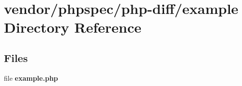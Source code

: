\section{vendor/phpspec/php-\/diff/example Directory Reference}
\label{dir_15c8aef8364336e0f742a9eada014f61}
\subsection*{Files}
\begin{DoxyCompactItemize}
\item 
file {\bf example.\+php}
\end{DoxyCompactItemize}
